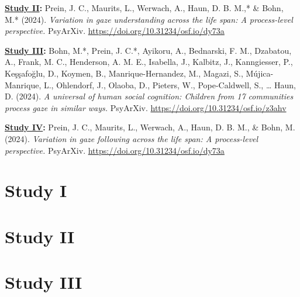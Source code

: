 \documentclass[
]{scrbook}
\begin{document}
\textbf{\hyperref[studyII]{Study II}:} Prein, J. C., Maurits, L., Werwach, A., Haun, D. B. M.,* \& Bohn, M.* (2024). \emph{Variation in gaze understanding across the life span: A process-level perspective.} PsyArXiv. \url{https://doi.org/10.31234/osf.io/dy73a}

\textbf{\hyperref[studyIII]{Study III}:} Bohn, M.*, Prein, J. C.*, Ayikoru, A., Bednarski, F. M., Dzabatou, A., Frank, M. C., Henderson, A. M. E., Isabella, J., Kalbitz, J., Kanngiesser, P., Keşşafoğlu, D., Koymen, B., Manrique-Hernandez, M., Magazi, S., Mújica-Manrique, L., Ohlendorf, J., Olaoba, D., Pieters, W., Pope-Caldwell, S., \ldots{} Haun, D. (2024). \emph{A universal of human social cognition: Children from 17 communities process gaze in similar ways.} PsyArXiv. \url{https://doi.org/10.31234/osf.io/z3ahv}

\textbf{\hyperref[studyIV]{Study IV}:} Prein, J. C., Maurits, L., Werwach, A., Haun, D. B. M., \& Bohn, M. (2024). \emph{Variation in gaze following across the life span: A process-level perspective.} PsyArXiv. \url{https://doi.org/10.31234/osf.io/dy73a}

\newpage

\section{Study I}\label{studyI}

\begin{minipage}{\textwidth}

\end{minipage}



\newpage

\section{Study II}\label{studyII}

\begin{minipage}{\textwidth}

\end{minipage}



\newpage

\section{Study III}\label{studyIII}
\end{document}
